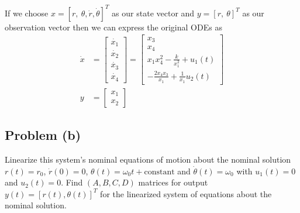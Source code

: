 \documentclass[11pt]{article}
\begin{document}
\subparagraph*{}
If we choose $x = [r,\ \theta, \dot{r}, \dot{\theta}]^T$ as our state vector and $y = [r,\ \theta]^T$ as our observation vector then we can express the original ODEs as
\begin{align*}
	\dot{x} &= \begin{bmatrix} \dot{x_1} \\ \dot{x_2} \\ \dot{x_3} \\ \dot{x_4} \end{bmatrix} 
	= \begin{bmatrix} x_3 \\
				x_4 \\
				x_1x_4^2 - \frac{k}{x_1^2}+u_1(t) \\
				-\frac{2x_4x_3}{x_1} + \frac{1}{x_1}u_2(t)
				\end{bmatrix} \\
	y &= \begin{bmatrix} x_1 \\ x_2 \end{bmatrix}
\end{align*}

\subsection*{Problem (b)}
Linearize this system's nominal equations of motion about the nominal solution $r(t) = r_0$, $\dot{r}(0) = 0$, $\theta(t) = \omega_0t+\text{constant}$ and $\dot{\theta}(t) = \omega_0$ with $u_1(t) = 0$ and $u_2(t) = 0$. Find $(A,B,C,D)$ matrices for output $y(t)=[r(t),\theta(t)]^T$ for the linearized system of equations about the nominal solution.
\end{document}
